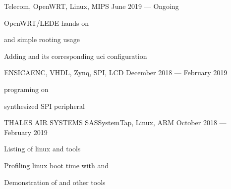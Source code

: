 
    {}{Telecom, OpenWRT, Linux, MIPS}
    {June 2019 --- Ongoing}
    {\begin{additems}
        \item OpenWRT/LEDE  hands-on
        \item {} and simple rooting usage
        \item Adding  and its corresponding uci configuration
    \end{additems}}


    {ENSICAEN}{C, VHDL, Zynq, SPI, LCD}
    {December 2018 --- February 2019}
    {\begin{additems}
        \item {} programing on 
        \item {} synthesized SPI peripheral
    \end{additems}}

    {THALES AIR SYSTEMS SAS}{SystemTap, Linux, ARM}
    {October 2018 --- February 2019}
    {\begin{additems}
        \item Listing of linux  and  tools
        \item Profiling linux boot time with  and 
        \item Demonstration of  and other tools
    \end{additems}}

